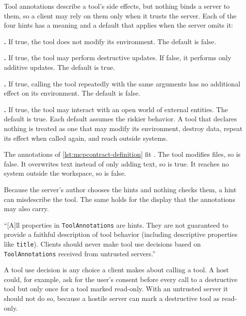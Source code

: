 Tool annotations describe a tool's side effects, but nothing binds a server to them, so a client may
rely on them only when it trusts the server. Each of the four hints has a meaning and a default that
applies when the server omits it:
\bi
\item \textbf{.} If true, the tool does not modify its environment. The
default is false.
\item \textbf{.} If true, the tool may perform destructive updates. If
false, it performs only additive updates. The default is true.
\item \textbf{.} If true, calling the tool repeatedly with the same
arguments has no additional effect on its environment. The default is false.
\item \textbf{.} If true, the tool may interact with an open world of
external entities. The default is true.
\ei
Each default assumes the riskier behavior. A tool that declares nothing is treated as one that may
modify its environment, destroy data, repeat its effect when called again, and reach outside
systems.

The annotations of \cref{lst:mcpcontract-definition} fit . The tool modifies files, so
 is false. It overwrites text instead of only adding text, so
 is true. It reaches no system outside the workspace, so
 is false.

Because the server's author chooses the hints and nothing checks them, a hint can misdescribe the
tool. The same holds for the display  that the annotations may also carry.

\begin{definition}
\label{def:mcpcontract-annotations}
``[A]ll properties in \texttt{ToolAnnotations} are hints. They are not guaranteed to provide a
faithful description of tool behavior (including descriptive properties like \texttt{title}).
Clients should never make tool use decisions based on \texttt{ToolAnnotations} received from
untrusted servers.'' \citep{mcp-spec-2026}
\end{definition}

A tool use decision is any choice a client makes about calling a tool. A host could, for example,
ask for the user's consent before every call to a destructive tool but only once for a tool marked
read-only. With an untrusted server it should not do so, because a hostile server can mark a
destructive tool as read-only.

